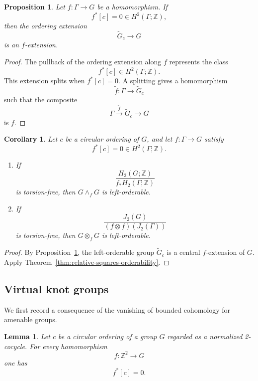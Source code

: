 \documentclass[10pt]{amsart}
\newtheorem{proposition}[theorem]{Proposition}
\newtheorem{corollary}[theorem]{Corollary}
\newtheorem{lemma}[theorem]{Lemma}
\renewcommand{\*}{\cdot {\dots} \cdot}
\newcommand{\?}[1]{\overset{?}{#1}}
\numberwithin{equation}{section}
\begin{document}
\begin{proposition}\label{prop:ordering-extension}
Let $f\colon\Gamma\to G$ be a homomorphism. If
\[
f^*[c]=0\in H^2(\Gamma;\mathbb Z),
\]
then the ordering extension
\[
\widetilde G_c\longrightarrow G
\]
is an $f$-extension.
\end{proposition}

\begin{proof}
The pullback of the ordering extension along $f$ represents
the class
\[
f^*[c]\in H^2(\Gamma;\mathbb Z).
\]
This extension splits when $f^*[c]=0$. A splitting gives a
homomorphism
\[
\widetilde f\colon\Gamma\longrightarrow\widetilde G_c
\]
such that the composite
\[
\Gamma\xrightarrow{\widetilde f}\widetilde G_c
\longrightarrow G
\]
is $f$.
\end{proof}

\begin{corollary}\label{cor:circular-order-relative-squares}
Let $c$ be a circular ordering of $G$, and let
$f\colon\Gamma\to G$ satisfy
\[
f^*[c]=0\in H^2(\Gamma;\mathbb Z).
\]

\begin{enumerate}
\item If
\[
\frac{H_2(G;\mathbb Z)}
     {f_*H_2(\Gamma;\mathbb Z)}
\]
is torsion-free, then $G\wedge_fG$ is left-orderable.

\item If
\[
\frac{J_2(G)}
     {(f\otimes f)(J_2(\Gamma))}
\]
is torsion-free, then $G\otimes_fG$ is left-orderable.
\end{enumerate}
\end{corollary}

\begin{proof}
By Proposition~\ref{prop:ordering-extension}, the left-orderable
group $\widetilde G_c$ is a central $f$-extension of $G$. Apply
Theorem~\ref{thm:relative-squares-orderability}.
\end{proof}

\subsection{Virtual knot groups}
\label{subsec:virtual-knot-groups}

We first record a consequence of the vanishing of bounded
cohomology for amenable groups.

\begin{lemma}\label{lem:euler-class-torus}
Let $c$ be a circular ordering of a group $G$ regarded as a
normalized 2-cocycle. For every homomorphism
\[
f\colon\mathbb Z^2\longrightarrow G
\]
one has
\[
f^*[c]=0.
\]
\end{lemma}
\end{document}
